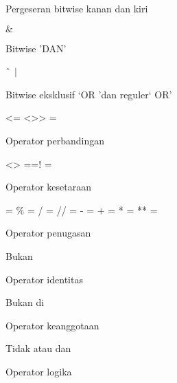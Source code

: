 \noindent 
Pergeseran bitwise kanan dan kiri \par
\vspace{12pt}
\noindent 
 $  \&  $ \par
\noindent 
Bitwise 'DAN' \par
\vspace{12pt}
\noindent 
 $  \string^  $  $  \vert  $ \par
\noindent 
Bitwise eksklusif `OR 'dan reguler` OR' \par
\vspace{12pt}
\noindent 
<= <>> = \par
\noindent 
Operator perbandingan \par
\vspace{12pt}
\noindent 
<> ==! = \par
\noindent 
Operator kesetaraan \par
\vspace{12pt}
\noindent 
= $  \%  $ = / = // = - = + = * = ** = \par
\noindent 
Operator penugasan \par
\vspace{12pt}
\noindent 
Bukan \par
\noindent 
Operator identitas \par
\vspace{12pt}
\noindent 
Bukan di \par
\noindent 
Operator keanggotaan \par
\vspace{12pt}
\noindent 
Tidak atau dan \par
\noindent 
Operator logika \par
\vspace{12pt}
\vspace{12pt}

